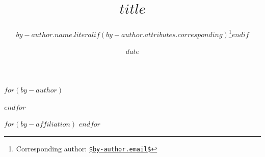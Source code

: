 \usepackage{authblk}
\renewcommand\Authfont{\normalsize\bfseries}
\renewcommand\Affilfont{\small\normalfont\itshape}
\setlength{\affilsep}{0.4em}

\title{$title$}

$for(by-author)$
\author[$for(by-author.affiliations)$$by-author.affiliations.number$$sep$,$endfor$]{$by-author.name.literal$$if(by-author.attributes.corresponding)$\thanks{Corresponding author: \href{mailto:$by-author.email$}{\nolinkurl{$by-author.email$}}}$endif$}
$endfor$

$for(by-affiliation)$
$endfor$

\date{$date$}
